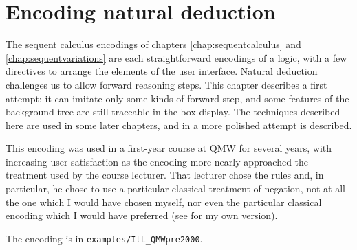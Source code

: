 \chapter{Encoding natural deduction}
\label{chap:ItL}

The sequent calculus encodings of chapters \ref{chap:sequentcalculus} and \ref{chap:sequentvariations} are each straightforward encodings of a logic, with a few directives to arrange the elements of the user interface. Natural deduction challenges us to allow forward reasoning steps. This chapter describes a first attempt: it can imitate only some kinds of forward step, and some features of the background tree are still traceable in the box display. The techniques described here are used in some later chapters, and in  a more polished attempt is described.

This encoding was used in a first-year course at QMW for several years, with increasing user satisfaction as the encoding more nearly approached the treatment used by the course lecturer. That lecturer chose the rules and, in particular, he chose to use a particular classical treatment of negation, not at all the one which I would have chosen myself, nor even the particular classical encoding which I would have preferred (see  for my own version).

The encoding is in \texttt{examples/ItL\_QMWpre2000}.

